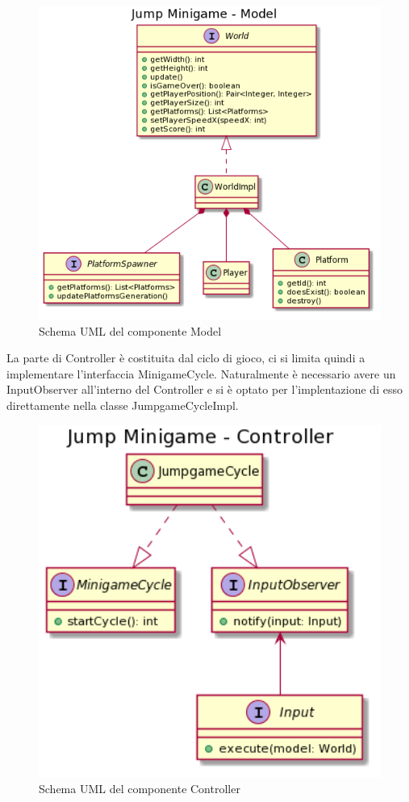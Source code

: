 \documentclass[a4paper,12pt]{report}
\begin{document}
    \begin{figure}[h]
        \centering{}
        \includegraphics[width=150mm]{images/picchiotti/jumpmodel.png}
        \caption{Schema UML del componente Model}
        \label{img:jumpmodel}
    \end{figure}
	La parte di Controller è costituita dal ciclo di gioco, ci si limita quindi a implementare l'interfaccia MinigameCycle.
    Naturalmente è necessario avere un InputObserver all'interno del Controller e si è optato per l'implentazione di esso direttamente nella classe JumpgameCycleImpl.
    \begin{figure}[!t]
        \centering{}
        \includegraphics[width=150mm]{images/picchiotti/jumpcontroller.png}
        \caption{Schema UML del componente Controller}
        \label{img:jumpcontroller}
    \end{figure}
\end{document}
